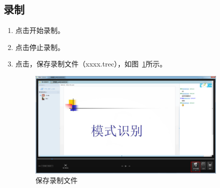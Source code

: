 \documentclass[12pt]{article}
\begin{document}
\subsection{录制}
\begin{enumerate}
\item 点击{\color{blue}{rec}}开始录制。\par
\item 点击{\color{blue}{F10}}停止录制。\par
\item 点击{\color{blue}{保存并编辑}}，保存录制文件（xxxx.trec），如图~\ref{fig:fig4}所示。
    \begin{figure}[!ht]
    \centering
    \includegraphics[width=0.9\textwidth]{fig4.png}
    \caption{保存录制文件}
    \label{fig:fig4}
    \end{figure}
\end{enumerate}
\end{document}
